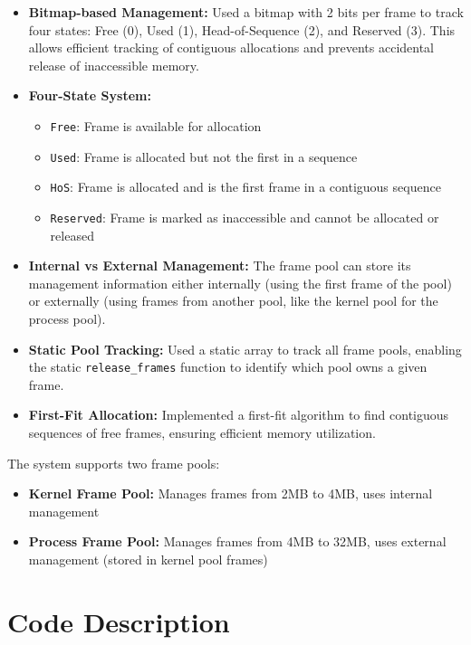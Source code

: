 \documentclass{article}
\begin{document}
\begin{itemize}
    \item \textbf{Bitmap-based Management:} Used a bitmap with 2 bits per frame to track four states: Free (0), Used (1), Head-of-Sequence (2), and Reserved (3). This allows efficient tracking of contiguous allocations and prevents accidental release of inaccessible memory.
    
    \item \textbf{Four-State System:} 
    \begin{itemize}
        \item \texttt{Free}: Frame is available for allocation
        \item \texttt{Used}: Frame is allocated but not the first in a sequence
        \item \texttt{HoS}: Frame is allocated and is the first frame in a contiguous sequence
        \item \texttt{Reserved}: Frame is marked as inaccessible and cannot be allocated or released
    \end{itemize}
    
    \item \textbf{Internal vs External Management:} The frame pool can store its management information either internally (using the first frame of the pool) or externally (using frames from another pool, like the kernel pool for the process pool).
    
    \item \textbf{Static Pool Tracking:} Used a static array to track all frame pools, enabling the static \texttt{release\_frames} function to identify which pool owns a given frame.
    
    \item \textbf{First-Fit Allocation:} Implemented a first-fit algorithm to find contiguous sequences of free frames, ensuring efficient memory utilization.
\end{itemize}

The system supports two frame pools:
\begin{itemize}
    \item \textbf{Kernel Frame Pool:} Manages frames from 2MB to 4MB, uses internal management
    \item \textbf{Process Frame Pool:} Manages frames from 4MB to 32MB, uses external management (stored in kernel pool frames)
\end{itemize}

\newpage
\section*{Code Description}
\end{document}
